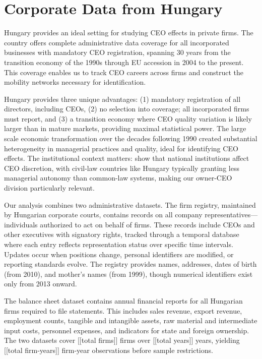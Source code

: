 \documentclass[11pt,a4paper]{article}
\begin{document}
\section{Corporate Data from Hungary}

Hungary provides an ideal setting for studying CEO effects in private firms. The country offers complete administrative data coverage for all incorporated businesses with mandatory CEO registration, spanning 30 years from the transition economy of the 1990s through EU accession in 2004 to the present. This coverage enables us to track CEO careers across firms and construct the mobility networks necessary for identification.

Hungary provides three unique advantages: (1) mandatory registration of all directors, including CEOs, (2) no selection into coverage; all incorporated firms must report, and (3) a transition economy where CEO quality variation is likely larger than in mature markets, providing maximal statistical power. The large scale economic transformation over the decades following 1990 created substantial heterogeneity in managerial practices and quality, ideal for identifying CEO effects. The institutional context matters: \citet{crossland2011differences} show that national institutions affect CEO discretion, with civil-law countries like Hungary typically granting less managerial autonomy than common-law systems, making our owner-CEO division particularly relevant.

Our analysis combines two administrative datasets. The firm registry, maintained by Hungarian corporate courts, contains records on all company representatives—individuals authorized to act on behalf of firms. These records include CEOs and other executives with signatory rights, tracked through a temporal database where each entry reflects representation status over specific time intervals. Updates occur when positions change, personal identifiers are modified, or reporting standards evolve. The registry provides names, addresses, dates of birth (from 2010), and mother's names (from 1999), though numerical identifiers exist only from 2013 onward.

The balance sheet dataset contains annual financial reports for all Hungarian firms required to file statements. This includes sales revenue, export revenue, employment counts, tangible and intangible assets, raw material and intermediate input costs, personnel expenses, and indicators for state and foreign ownership. The two datasets cover [[total firms]] firms over [[total years]] years, yielding [[total firm-years]] firm-year observations before sample restrictions.
\end{document}
